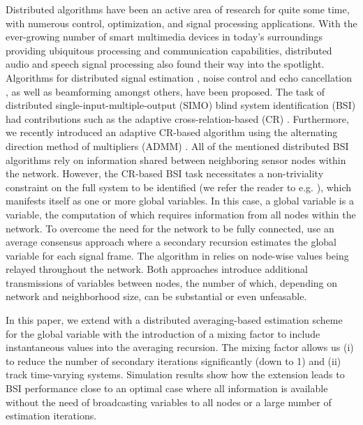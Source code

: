 \documentclass{article}
\begin{document}
Distributed algorithms have been an active area of research for quite some time, with numerous control, optimization, and signal processing applications.
With the ever-growing number of smart multimedia devices in today's surroundings providing ubiquitous processing and communication capabilities, distributed audio and speech signal processing also found their way into the spotlight.
Algorithms for distributed signal estimation \cite{5483092}, noise control and echo cancellation \cite{9670697}, as well as beamforming \cite{6663655,6329934,MARKOVICHGOLAN20154} amongst others, have been proposed.
The task of distributed single-input-multiple-output (SIMO) blind system identification (BSI) had contributions such as the adaptive cross-relation-based (CR) \cite{yuDistributedBlindSystem2014, liuDistributedBlindIdentification2016}.
Furthermore, we recently introduced an adaptive CR-based algorithm \cite{blochbergerDBSI} using the alternating direction method of multipliers (ADMM) \cite{boydDistributedOptimizationStatistical2011}.
All of the mentioned distributed BSI algorithms rely on information shared between neighboring sensor nodes within the network.
However, the CR-based BSI task necessitates a non-triviality constraint on the full system to be identified (we refer the reader to e.g. \cite{huangAdaptiveMultichannelLeast2002,huangClassFrequencydomainAdaptive2003}), which manifests itself as one or more global variables.
In this case, a global variable is a variable, the computation of which requires information from all nodes within the network.
To overcome the need for the network to be fully connected, \cite{yuDistributedBlindSystem2014, liuDistributedBlindIdentification2016} use an average consensus \cite{xiaoFastLinearIterations2004} approach where a secondary recursion estimates the global variable for each signal frame.
The algorithm in \cite{blochbergerDBSI} relies on node-wise values being relayed throughout the network.
Both approaches introduce additional transmissions of variables between nodes, the number of which, depending on network and neighborhood size, can be substantial or even unfeasable.

In this paper, we extend \cite{blochbergerDBSI} with a distributed averaging-based \cite{xiaoFastLinearIterations2004} estimation scheme for the global variable with the introduction of a mixing factor to include instantaneous values into the averaging recursion.
The mixing factor allows us (i) to reduce the number of secondary iterations significantly (down to 1) and (ii) track time-varying systems.
Simulation results show how the extension leads to BSI performance close to an optimal case where all information is available without the need of broadcasting variables to all nodes or a large number of estimation iterations.
\end{document}
